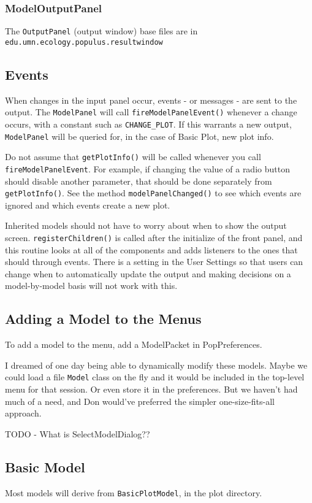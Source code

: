 \documentclass[12pt]{article}
\begin{document}
\subsubsection{ModelOutputPanel}
The \texttt{OutputPanel}  (output window) base files are in \texttt{edu.umn.ecology.populus.resultwindow}

\subsection{Events}

When changes in the input panel occur, events - or messages - are sent to the output.
The \texttt{ModelPanel}  will call \texttt{fireModelPanelEvent()}  whenever a change occurs, with a constant such as \texttt{CHANGE\_PLOT}.  If this warrants a new output, \texttt{ModelPanel}  will be queried for, in the case of Basic Plot, new plot info.

Do not assume that \texttt{getPlotInfo()} will be called whenever you call \texttt{fireModelPanelEvent}.  For example, if changing the value of a radio button should disable another parameter, that should be done separately from \texttt{getPlotInfo()}.  See the method \texttt{modelPanelChanged()} to see which events are ignored and which events create a new plot.

Inherited models should not have to worry about when to show the output screen.  \texttt{registerChildren()} is called after the initialize of the front panel, and this routine looks at all of the components and adds listeners to the ones that should through events.  There is a setting in the User Settings so that users can change when to automatically update the output and making decisions on a model-by-model basis will not work with this.

\subsection{Adding a Model to the Menus}
To add a model to the menu, add a ModelPacket in PopPreferences.

I dreamed of one day being able to dynamically modify these models.  Maybe we could load a file \texttt{Model} class on the fly and it would be included in the top-level menu for that session.  Or even store it in the preferences.  But we haven't had much of a need, and Don would've preferred the simpler one-size-fits-all approach.


TODO - What is SelectModelDialog??

\subsection{Basic Model}
Most models will derive from \texttt{BasicPlotModel}, in the plot directory.
\end{document}
